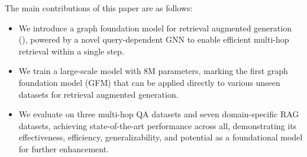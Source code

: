 The main contributions of this paper are as follows:
\begin{itemize}
\item We introduce a graph foundation model for retrieval augmented generation (\ourmethod), powered by a novel query-dependent GNN to enable efficient multi-hop retrieval within a single step.
\item We train a large-scale model with 8M parameters, marking the first graph foundation model (GFM) that can be applied directly to various unseen datasets for retrieval augmented generation.
\item We evaluate \ourmethod on three multi-hop QA datasets and seven domain-specific RAG datasets, achieving state-of-the-art performance across all, demonstrating its effectiveness, efficiency, generalizability, and potential as a foundational model for further enhancement.
\end{itemize}

